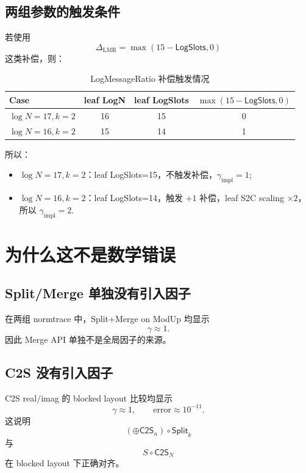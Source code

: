 \documentclass[UTF8,a4paper,11pt]{ctexart}
\newcommand{\CtwoS}{\mathsf{C2S}}
\newcommand{\Split}{\mathsf{Split}}
\newcommand{\LogSlots}{\mathsf{LogSlots}}
\begin{document}
\subsection{两组参数的触发条件}

若使用
\begin{equation}
\Delta_{\mathrm{LMR}}
=\max(15-\LogSlots,0)
\end{equation}
这类补偿，则：

\begin{table}[H]
\centering
\caption{LogMessageRatio 补偿触发情况}
\begin{tabular}{lccc}
\toprule
Case & leaf LogN & leaf LogSlots & $\max(15-\LogSlots,0)$ \\
\midrule
$\log N=17,k=2$ & 16 & 15 & 0 \\
$\log N=16,k=2$ & 15 & 14 & 1 \\
\bottomrule
\end{tabular}
\end{table}

所以：
\begin{itemize}[leftmargin=2em]
\item $\log N=17,k=2$：leaf LogSlots=15，不触发补偿，$\gamma_{\mathrm{impl}}=1$;
\item $\log N=16,k=2$：leaf LogSlots=14，触发 $+1$ 补偿，leaf S2C scaling $\times2$，所以 $\gamma_{\mathrm{impl}}=2$.
\end{itemize}

\section{为什么这不是数学错误}

\subsection{Split/Merge 单独没有引入因子}

在两组 normtrace 中，Split+Merge on ModUp 均显示
\begin{equation}
\gamma\approx1.
\end{equation}
因此 Merge API 单独不是全局因子的来源。

\subsection{C2S 没有引入因子}

C2S real/imag 的 blocked layout 比较均显示
\begin{equation}
\gamma\approx1,
\qquad
\text{error}\approx10^{-11}.
\end{equation}
这说明
\begin{equation}
(\oplus\CtwoS_n)\circ\Split_k
\end{equation}
与
\begin{equation}
S\circ\CtwoS_N
\end{equation}
在 blocked layout 下正确对齐。
\end{document}
